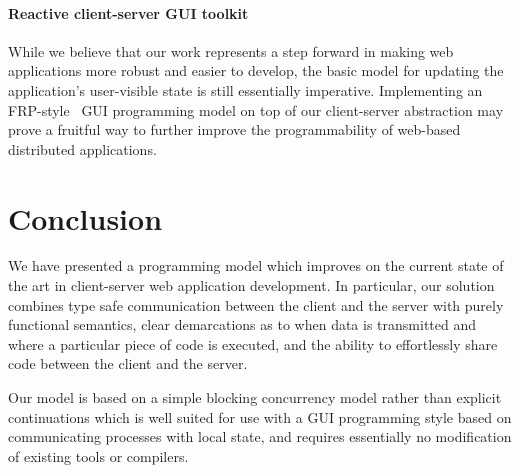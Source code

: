 \documentclass[preprint]{sigplanconf}
\begin{document}
\paragraph{Reactive client-server GUI toolkit} While we believe that our work
represents a step forward in making web applications more robust and easier to
develop, the basic model for updating the application's user-visible state is
still essentially imperative. Implementing an FRP-style\ \cite{ppfrp} GUI
programming model on top of our client-server abstraction may prove a fruitful
way to further improve the programmability of web-based distributed
applications.

\section{Conclusion}

We have presented a programming model which improves on the current state of
the art in client-server web application development. In particular, our
solution combines type safe communication between the client and the server
with purely functional semantics, clear demarcations as to when data is
transmitted and where a particular piece of code is executed, and the ability to
effortlessly share code between the client and the server.

Our model is based on a simple blocking concurrency model rather than explicit
continuations which is well suited for use with a GUI programming style based on
communicating processes with local state, and requires essentially no
modification of existing tools or compilers.

%




\end{document}
